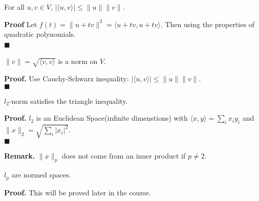 \documentclass[main.tex]{subfiles}
\begin{document}
\begin{theorem}
    For all $u, v \in V$, $|\langle u, v \rangle| \le \|u\|\|v\|$.
\end{theorem}
\par \noindent \textbf{Proof} Let $f(t) = \|u + tv\|^2 = \langle u + tv, u + tv \rangle$. Then using the properties of quadratic polynomials. 
\\ \null \hfill $\blacksquare$ \
\begin{property}
    $\|v\| = \sqrt{\langle v, v \rangle}$ is a norm on $V$. 
\end{property}

\par \noindent \textbf{Proof. } Use Cauchy-Schwarz inequality: $|\langle u, v \rangle| \le \|u\|\|v\|$.
\\ \null \hfill $\blacksquare$ 
\begin{corollary}
    $l_2$-norm satisfies the triangle inequality. 
\end{corollary}

\par \noindent \textbf{Proof. } $l_2$ is an Euclidean Space(infinite dimenstions) with $\langle x, y \rangle = \sum_i x_i y_i$ and $\|x\|_2 = \sqrt{\sum_i |x_i|^2}$. 
\\ \null \hfill $\blacksquare$ 
\par \noindent \textbf{Remark. } $\|x\|_p$ does not come from an inner product if $p \neq 2$. 

\begin{theorem}
    $l_p$ are normed spaces. 
\end{theorem}
\par \noindent \textbf{Proof. } This will be proved later in the course. 
\end{document}
